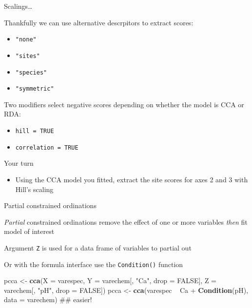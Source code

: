 \documentclass[10pt,ignorenonframetext,compress, aspectratio=169]{beamer}
\newenvironment{Shaded}{\begin{snugshade}}{\end{snugshade}}
\newcommand{\KeywordTok}[1]{\textcolor[rgb]{0.13,0.29,0.53}{\textbf{{#1}}}}
\newcommand{\DataTypeTok}[1]{\textcolor[rgb]{0.13,0.29,0.53}{{#1}}}
\newcommand{\StringTok}[1]{\textcolor[rgb]{0.31,0.60,0.02}{{#1}}}
\newcommand{\OtherTok}[1]{\textcolor[rgb]{0.56,0.35,0.01}{{#1}}}
\newcommand{\NormalTok}[1]{{#1}}
\providecommand{\tightlist}{%
  \setlength{\itemsep}{0pt}\setlength{\parskip}{0pt}}
\begin{document}
\begin{frame}[fragile]{Scalings\ldots{}}

Thankfully we can use alternative descrpitors to extract scores:

\begin{itemize}
\tightlist
\item
  \texttt{"none"}
\item
  \texttt{"sites"}
\item
  \texttt{"species"}
\item
  \texttt{"symmetric"}
\end{itemize}

Two modifiers select negative scores depending on whether the model is
CCA or RDA:

\begin{itemize}
\tightlist
\item
  \texttt{hill\ =\ TRUE}
\item
  \texttt{correlation\ =\ TRUE}
\end{itemize}

\end{frame}

\begin{frame}{Your turn}

\begin{itemize}
\tightlist
\item
  Using the CCA model you fitted, extract the site scores for axes 2 and
  3 with Hill's scaling
\end{itemize}

\end{frame}

\begin{frame}[fragile]{Partial constrained ordinations}

\emph{Partial} constrained ordinations remove the effect of one or more
variables \emph{then} fit model of interest

Argument \texttt{Z} is used for a data frame of variables to partial out

Or with the formula interface use the \texttt{Condition()} function

\scriptsize

\begin{Shaded}
\begin{Highlighting}[]
\NormalTok{pcca <-}\StringTok{ }\KeywordTok{cca}\NormalTok{(}\DataTypeTok{X =} \NormalTok{varespec,}
            \DataTypeTok{Y =} \NormalTok{varechem[, }\StringTok{"Ca"}\NormalTok{, }\DataTypeTok{drop =} \OtherTok{FALSE}\NormalTok{],}
            \DataTypeTok{Z =} \NormalTok{varechem[, }\StringTok{"pH"}\NormalTok{, }\DataTypeTok{drop =} \OtherTok{FALSE}\NormalTok{])}
\NormalTok{pcca <-}\StringTok{ }\KeywordTok{cca}\NormalTok{(varespec ~}\StringTok{ }\NormalTok{Ca +}\StringTok{ }\KeywordTok{Condition}\NormalTok{(pH), }\DataTypeTok{data =} \NormalTok{varechem) ## easier!}
\end{Highlighting}
\end{Shaded}

\normalsize

\end{frame}
\end{document}
